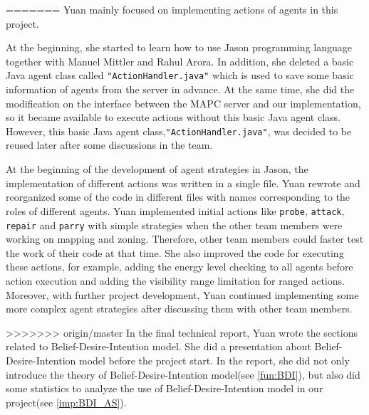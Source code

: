 =======
Yuan mainly focused on implementing actions of agents in this project.

At the beginning, she started to learn how to use Jason programming language together with Manuel Mittler and Rahul Arora. 
In addition, she deleted a basic Java agent class called \texttt{"ActionHandler.java"} which is used to save some basic information of agents from the server in advance.
At the same time, she did the modification on the interface between the MAPC server and our implementation, so it became available to execute actions without this basic Java agent class. 
However, this basic Java agent class,\texttt{"ActionHandler.java"}, was decided to be reused later after some discussions in the team.

At the beginning of the development of agent strategies in Jason, the implementation of different actions was written in a single file. 
Yuan rewrote and reorganized some of the code in different files with names corresponding to the roles of different agents. 
Yuan implemented initial actions like \texttt{probe}, \texttt{attack}, \texttt{repair} and \texttt{parry} with simple strategies when the other team members were working on mapping and zoning. 
Therefore, other team members could faster test the work of their code at that time. 
She also improved the code for executing these actions, for example, adding the energy level checking to all agents before action execution and adding the visibility range limitation for ranged actions. 
Moreover, with further project development, Yuan continued implementing some more complex agent strategies after discussing them with other team members. 

>>>>>>> origin/master
In the final technical report, Yuan wrote the sections related to Belief-Desire-Intention model. 
She did a presentation about Belief-Desire-Intention model before the project start. 
In the report, she did not only introduce the theory of Belief-Desire-Intention model(see \autoref{fun:BDI}), but also did some statistics to analyze the use of Belief-Desire-Intention model in our project(see \autoref{imp:BDI_AS}). 